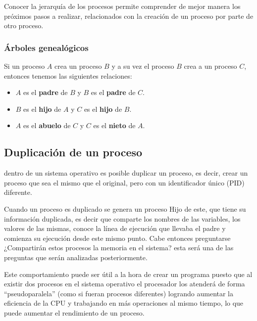 Conocer la jerarquía de los procesos permite comprender de mejor manera los próximos pasos a realizar, relacionados con la creación de un proceso por parte de otro proceso.

\subsubsection{Árboles genealógicos}
Si un proceso $A$ crea un proceso $B$ y a su vez el proceso $B$ crea a un proceso $C$, entonces tenemos las siguientes relaciones:
\begin{itemize}
    \item $A$ es el \textbf{padre} de $B$ y $B$ es el \textbf{padre} de $C$.
    \item $B$ es el \textbf{hijo} de $A$ y $C$ es el \textbf{hijo} de $B$.
    \item $A$ es el \textbf{abuelo} de $C$ y $C$ es el \textbf{nieto} de $A$.
\end{itemize}

\subsection{Duplicación de un proceso}
dentro de un sistema operativo es posible duplicar un proceso, es decir, crear un proceso que sea el mismo que el original, pero con un identificador único (PID) diferente.

Cuando un proceso es duplicado se genera un proceso Hijo de este, que tiene su información duplicada, es decir que comparte los nombres de las variables, los valores de las mismas, conoce la línea de ejecución que llevaba el padre y comienza su ejecución desde este mismo punto. Cabe entonces preguntarse ¿Compartirán estos procesos la memoria en el sistema? esta será una de las preguntas que serán analizadas posteriormente.

Este comportamiento puede ser útil a la hora de crear un programa puesto que al existir dos procesos en el sistema operativo el procesador los atenderá de forma ``pseudoparalela'' (como si fueran procesos diferentes) logrando aumentar la eficiencia de la CPU y trabajando en más operaciones al mismo tiempo, lo que puede aumentar el rendimiento de un proceso.